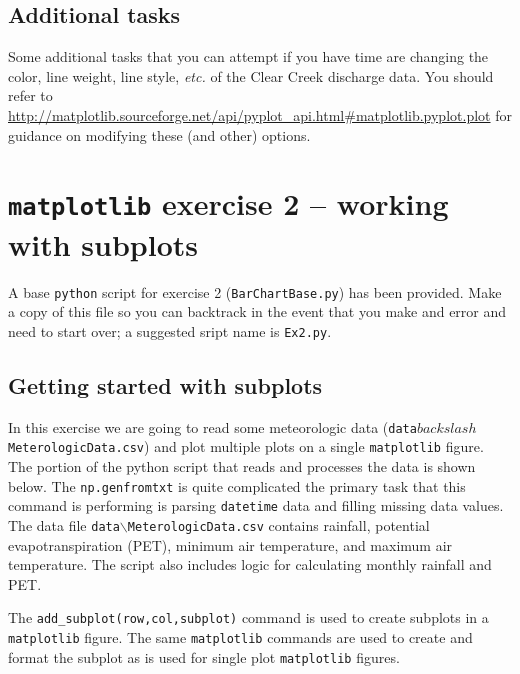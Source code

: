 \documentclass[12pt]{article}
\begin{document}
\subsection{Additional tasks}
Some additional tasks that you can attempt if you have time are changing the color, line weight, line style, \textit{etc.} of the Clear Creek discharge data. You should refer to \url{http://matplotlib.sourceforge.net/api/pyplot_api.html\#matplotlib.pyplot.plot} for guidance on modifying these (and other) options.

\section{\texttt{matplotlib} exercise 2 -- working with subplots}
A base \texttt{python} script for exercise 2 (\texttt{BarChartBase.py}) has been provided. Make a copy of this file so you can backtrack in the event that you make and error and need to start over; a suggested sript name is \texttt{Ex2.py}.

\subsection{Getting started with subplots}
In this exercise we are going to read some meteorologic data (\texttt{data$backslash$MeterologicData.csv}) and plot multiple plots on a single \texttt{matplotlib} figure. The portion of the python script that reads and processes the data is shown below. The \texttt{np.genfromtxt} is quite complicated the primary task that this command is performing is parsing \texttt{datetime} data and filling missing data values. The data file \texttt{data$\backslash$MeterologicData.csv} contains rainfall, potential evapotranspiration (PET), minimum air temperature, and maximum air temperature. The script also includes logic for calculating monthly rainfall and PET.

\begin{center}
	
\end{center}

The \texttt{add\_subplot(row,col,subplot)} command is used to create subplots in a \texttt{matplotlib} figure. The same \texttt{matplotlib} commands are used to create and format the subplot as is used for single plot \texttt{matplotlib} figures.

\begin{center}
	
\end{center}
\end{document}
